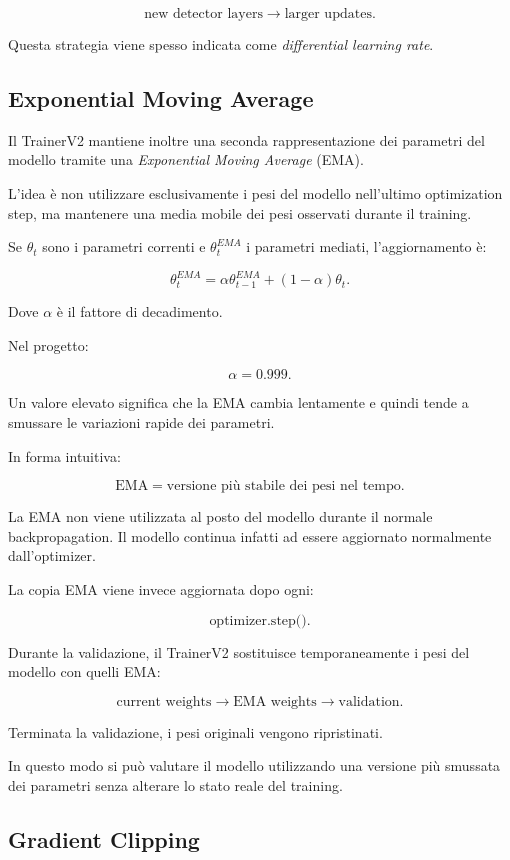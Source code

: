 \[
\text{new detector layers}
\rightarrow
\text{larger updates}.
\]

Questa strategia viene spesso indicata come \textit{differential learning
rate}.

\subsection{Exponential Moving Average}

Il TrainerV2 mantiene inoltre una seconda rappresentazione dei parametri del
modello tramite una \textit{Exponential Moving Average} (EMA).

L'idea è non utilizzare esclusivamente i pesi del modello nell'ultimo
optimization step, ma mantenere una media mobile dei pesi osservati durante il
training.

Se $\theta_t$ sono i parametri correnti e $\theta_t^{EMA}$ i parametri mediati,
l'aggiornamento è:

\[
\theta_t^{EMA}
=
\alpha\theta_{t-1}^{EMA}
+
(1-\alpha)\theta_t.
\]

Dove $\alpha$ è il fattore di decadimento.

Nel progetto:

\[
\alpha=0.999.
\]

Un valore elevato significa che la EMA cambia lentamente e quindi tende a
smussare le variazioni rapide dei parametri.

In forma intuitiva:

\[
\text{EMA}
=
\text{versione più stabile dei pesi nel tempo}.
\]

La EMA non viene utilizzata al posto del modello durante il normale
backpropagation. Il modello continua infatti ad essere aggiornato normalmente
dall'optimizer.

La copia EMA viene invece aggiornata dopo ogni:

\[
\text{optimizer.step()}.
\]

Durante la validazione, il TrainerV2 sostituisce temporaneamente i pesi del
modello con quelli EMA:

\[
\text{current weights}
\rightarrow
\text{EMA weights}
\rightarrow
\text{validation}.
\]

Terminata la validazione, i pesi originali vengono ripristinati.

In questo modo si può valutare il modello utilizzando una versione più
smussata dei parametri senza alterare lo stato reale del training.

\subsection{Gradient Clipping}

